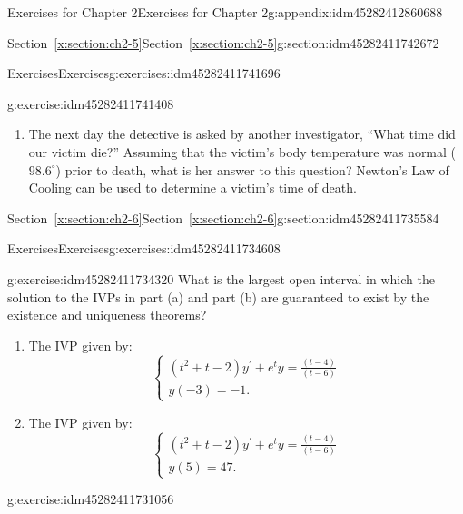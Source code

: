 \documentclass[oneside,10pt,]{book}
\numberwithin{equation}{section}
\numberwithin{equation}{section}
\begin{document}
\begin{appendixptx}{Exercises for Chapter 2}{}{Exercises for Chapter 2}{}{}{g:appendix:idm45282412860688}
\begin{sectionptx}{Section~\ref*{x:section:ch2-5}}{}{Section~\ref*{x:section:ch2-5}}{}{}{g:section:idm45282411742672}
\begin{exercises-subsection-numberless}{Exercises}{}{Exercises}{}{}{g:exercises:idm45282411741696}
\begin{divisionexercise}{1}{}{}{g:exercise:idm45282411741408}
\begin{enumerate}[label=(\alph*)]
\item{}The next day the detective is asked by another investigator, ``What time did our victim die?'' Assuming that the victim's body temperature was normal (\(98.6^{\circ}\)) prior to death, what is her answer to this question? Newton's Law of Cooling can be used to determine a victim's time of death.%
\end{enumerate}
%
\end{divisionexercise}%
\end{exercises-subsection-numberless}
\end{sectionptx}
%
%
\typeout{************************************************}
\typeout{************************************************}
%
\begin{sectionptx}{Section~\ref*{x:section:ch2-6}}{}{Section~\ref*{x:section:ch2-6}}{}{}{g:section:idm45282411735584}
%
%
\typeout{************************************************}
\typeout{************************************************}
%
\begin{exercises-subsection-numberless}{Exercises}{}{Exercises}{}{}{g:exercises:idm45282411734608}
\begin{divisionexercise}{1}{}{}{g:exercise:idm45282411734320}%
What is the largest open interval in which the solution to the IVPs in part (a) and part (b) are guaranteed to exist by the existence and uniqueness theorems?%
\begin{enumerate}[label=(\alph*)]
\item{}The IVP given by:%
\begin{equation*}
\begin{cases}
\left(t^{2}+t-2\right)y^{\prime}+e^{t}y=\frac{\left(t-4\right)}{\left(t-6\right)}\\
y(-3)=-1.
\end{cases}
\end{equation*}
%
\item{}The IVP given by:%
\begin{equation*}
\begin{cases}
\left(t^{2}+t-2\right)y^{\prime}+e^{t}y=\frac{\left(t-4\right)}{\left(t-6\right)}\\
y(5)=47.
\end{cases}
\end{equation*}
%
\end{enumerate}
%
\end{divisionexercise}%
\begin{divisionexercise}{2}{}{}{g:exercise:idm45282411731056}%

\end{divisionexercise}
\end{exercises-subsection-numberless}
\end{sectionptx}
\end{appendixptx}
\end{document}
